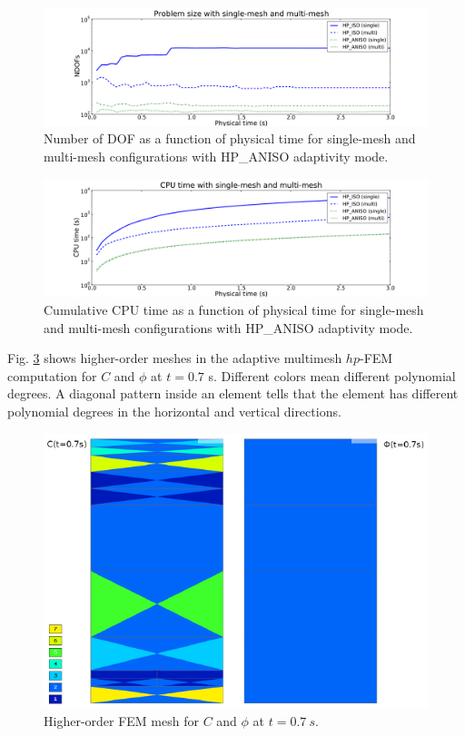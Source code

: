 \begin{figure}[!ht]
  \begin{centering}
  \includegraphics[width=\columnwidth]{singlemulti_dof}
  \caption{\label{fig:singlemultidof} Number of DOF as a function 
  of physical time for single-mesh and multi-mesh configurations with 
  HP\_ANISO adaptivity mode.}
  \end{centering}
\end{figure}


\begin{figure}[!ht]
  \begin{centering}
  \includegraphics[width=\columnwidth]{singlemulti_cpu}
  \caption{\label{fig:singlemulticpu} Cumulative CPU time as a function 
  of physical time for single-mesh and multi-mesh configurations with 
  HP\_ANISO adaptivity mode.}
  \end{centering}
\end{figure}

\noindent 
Fig. \ref{fig:poly} shows higher-order meshes in the adaptive multimesh $hp$-FEM
computation for $C$ and $\phi$ at $t = 0.7$ s. Different 
colors mean different polynomial degrees. A diagonal pattern inside an element 
tells that the element has different polynomial degrees in the 
horizontal and vertical directions. 


\begin{figure}[!ht]
  \begin{centering}
  \includegraphics[width=.75\columnwidth]{poly}
  \caption{\label{fig:poly} Higher-order FEM mesh for 
  $C$ and $\phi$ at $t=0.7\ s$. }
  \end{centering}
\end{figure}

